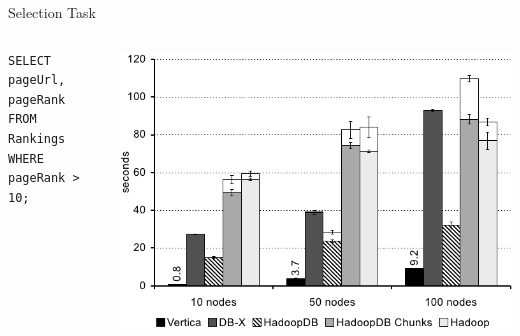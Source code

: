 \documentclass{beamer}
\begin{document}
\begin{frame}[fragile]{Selection Task}
  \begin{columns}
    \begin{column}{0.3\textwidth}
\begin{verbatim}
SELECT pageUrl,
pageRank 
FROM Rankings
WHERE pageRank > 10;
\end{verbatim} 
    \end{column}
    \begin{column}{0.7\textwidth}
      \includegraphics[width=\textwidth]{../ausarbeitung/images/diagram_selection_task.png}
    \end{column}
  \end{columns}
\end{frame}
\end{document}
